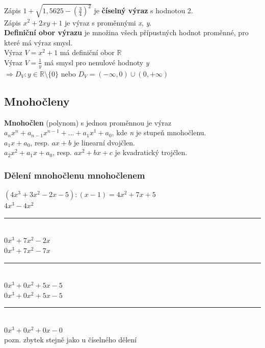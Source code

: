 \documentclass[12pt, a4paper]{article}
\begin{document}
Zápis $ 1 + \sqrt{1,5625-(\frac{3}{4})^2} $ je \textbf{číselný výraz} s hodnotou 2.\\
Zápis $ x^2 + 2xy +1 $ je výraz s proměnnými \textit{x}, \textit{y}.\\
\textbf{Definiční obor výrazu} je množina všech přípustných hodnot proměnné, pro které má výraz smysl.\\
Výraz $V = x^2 +1 $ má definiční obor $\mathbb{R}$\\
Výraz $V = \frac{1}{y}$ má smysl pro nenulové hodnoty \textit{y} \\
 $\Rightarrow D_V : y \in \mathbb{R} \setminus \{0\}$  nebo $ D_V = (-\infty,0) \cup (0,+\infty)$\\

\subsection*{Mnohočleny}
\textbf{Mnohočlen} (polynom) s jednou proměnnou je výraz $ a_nx^n + a_{n-1}x^{n-1} +...+ a_1x^1 + a_0 $, kde \textit{n} je stupeň mnohočlenu.\\
$a_1x + a_0$, resp. $ax+b$ je linearní dvojčlen.\\
$a_2x^2 + a_1x + a_0$, resp. $ax^2 + bx + c$ je kvadratický trojčlen.\\

\subsubsection*{Dělení mnohočlenu mnohočlenem}
$(4x^3 + 3x^2 - 2x -5):(x-1) = 4x^2 + 7x + 5$\\
$ 4x^3 - 4x^2$\\
\rule{2cm}{0.4pt}\\
$ 0x^3 + 7x^2 -2x$\\
$ 0x^3 + 7x^2 -7x$\\
\rule{3cm}{0.4pt}\\
$0x^3 + 0x^2 + 5x - 5$\\
$0x^3 + 0x^2 + 5x - 5$\\
\rule{4cm}{0.4pt}\\
$0x^3 + 0x^2 + 0x - 0$\\
pozn. zbytek stejně jako u číselného dělení\\
\end{document}
